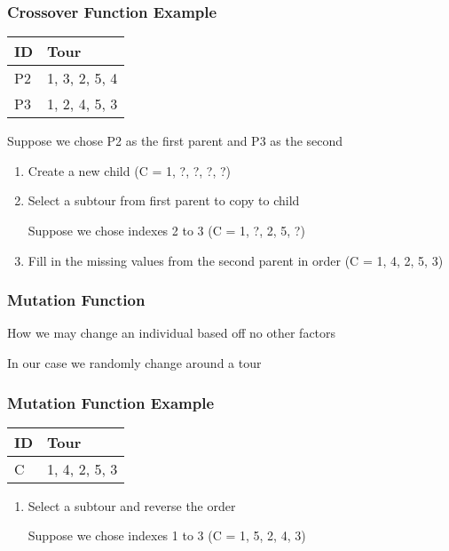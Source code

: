 \documentclass[aspectratio=169,10pt,compress]{beamer}
\begin{document}
\begin{frame}
  \frametitle{Crossover Function Example}

  \begin{center}
    \begin{tabular}{ll}
      \toprule
      ID & Tour\\
      \midrule
      P2 & 1, 3, 2, 5, 4\\
      P3 & 1, 2, 4, 5, 3\\
      \bottomrule
    \end{tabular}
  \end{center}

  Suppose we chose P2 as the first parent and P3 as the second

  \begin{enumerate}
    \item Create a new child (C = 1, ?, ?, ?, ?)
    \item Select a subtour from first parent to copy to child

      Suppose we chose indexes 2 to 3 (C = 1, ?, 2, 5, ?)
    \item Fill in the missing values from the second parent in order
      (C = 1, 4, 2, 5, 3)
  \end{enumerate}
\end{frame}

\begin{frame}
  \frametitle{Mutation Function}

  How we may change an individual based off no other factors

  \vspace{2em}

  In our case we randomly change around a tour
\end{frame}

\begin{frame}
  \frametitle{Mutation Function Example}

  \begin{center}
    \begin{tabular}{ll}
      \toprule
      ID & Tour\\
      \midrule
      C & 1, 4, 2, 5, 3\\
      \bottomrule
    \end{tabular}
  \end{center}

  \begin{enumerate}
    \item Select a subtour and reverse the order

      Suppose we chose indexes 1 to 3 (C = 1, 5, 2, 4, 3)
  \end{enumerate}
\end{frame}
\end{document}
